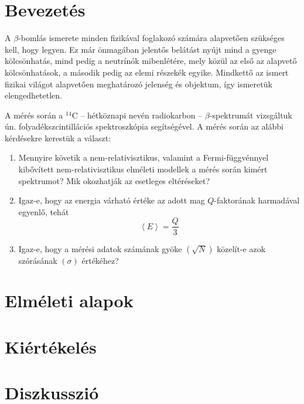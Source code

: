 \begin{multicols}{2}
\section{Bevezetés}
A $\beta$-bomlás ismerete minden fizikával foglakozó számára alapvetően szükséges kell, hogy legyen. Ez már önmagában jelentős belátást nyújt mind a gyenge kölcsönhatás, mind pedig a neutrínók mibenlétére, mely közül az első az alapvető kölcsönhatások, a második pedig az elemi részekék egyike. Mindkettő az ismert fizikai világot alapvetően meghatározó jelenség és objektum, így ismeretük elengedhetetlen. \par
A mérés során a $^{14}$C -- hétköznapi nevén radiokarbon -- $\beta$-spektrumát vizsgáltuk ún. folyadékszcintillációs spektroszkópia segítségével. A mérés során az alábbi kérdésekre kerestük a választ:
\begin{enumerate}
\item Mennyire követik a nem-relativisztikus, valamint a Fermi-függvénnyel kibővített nem-relativisztikus elméleti modellek a mérés során kimért spektrumot? Mik okozhatják az esetleges eltéréseket?
\item Igaz-e, hogy az energia várható értéke az adott mag $Q$-faktorának harmadával egyenlő, tehát
	\begin{equation}
	\left< E \right> = \frac{Q}{3}
	\end{equation}
\item Igaz-e, hogy a mérési adatok számának gyöke $\left( \sqrt{N} \right)$ közelít-e azok szórásának $\left( \sigma \right)$ értékéhez?
\end{enumerate}

\section{Elméleti alapok}


\section{Kiértékelés}


\section{Diszkusszió}


\end{multicols}